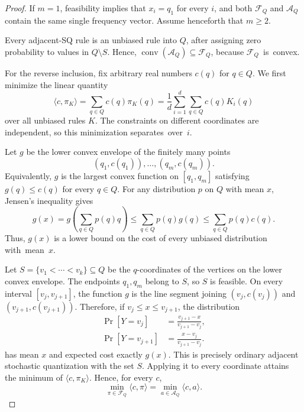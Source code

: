\documentclass[10pt,a4paper]{amsart}
\begin{document}
\begin{proof}
If $m=1$, feasibility implies that $x_i=q_1$ for every $i$, and both
$\mathcal{F}_Q$ and $\mathcal{A}_Q$ contain the same single frequency vector.
Assume henceforth that $m\ge2$.

Every adjacent-SQ rule is an unbiased rule into $Q$, after assigning zero
probability to values in $Q\setminus S$. Hence,
$\operatorname{conv}(\mathcal{A}_Q)\subseteq\mathcal{F}_Q$, because
\mbox{$\mathcal{F}_Q$ is convex.}

For the reverse inclusion, fix arbitrary real numbers $c(q)$ for $q\in Q$.
We first minimize the linear quantity
\[
\langle c,\pi_K\rangle
=\sum_{q\in Q}c(q)\pi_K(q)
=\frac{1}{d}\sum_{i=1}^d\sum_{q\in Q}c(q)K_i(q)
\]
over all unbiased rules $K$. The constraints on different coordinates are
independent, so this minimization \mbox{separates over $i$.}

Let $g$ be the lower convex envelope of the finitely many points
\[
(q_1,c(q_1)),\ldots,(q_m,c(q_m)).
\]
Equivalently, $g$ is the largest convex function on $[q_1,q_m]$ satisfying
$g(q)\le c(q)$ for every $q\in Q$. For any distribution $p$ on $Q$ with mean
$x$, Jensen's inequality gives
\[
g(x)
=g\!\left(\sum_{q\in Q}p(q)q\right)
\le\sum_{q\in Q}p(q)g(q)
\le\sum_{q\in Q}p(q)c(q).
\]
Thus, $g(x)$ is a lower bound on the cost of every unbiased distribution \mbox{with
mean $x$.}

Let $S=\{v_1<\cdots<v_k\}\subseteq Q$ be the $q$-coordinates of the vertices
on the lower convex envelope. The endpoints $q_1,q_m$ belong to $S$, so $S$ is
feasible. On every interval $[v_j,v_{j+1}]$, the function $g$ is the line
segment joining $(v_j,c(v_j))$ and $(v_{j+1},c(v_{j+1}))$. Therefore, if
$v_j\le x\le v_{j+1}$, the distribution
\begin{align*}
\Pr[Y=v_j]
&=\frac{v_{j+1}-x}{v_{j+1}-v_j},\\
\Pr[Y=v_{j+1}]
&=\frac{x-v_j}{v_{j+1}-v_j}.
\end{align*}
has mean $x$ and expected cost exactly $g(x)$. This is precisely ordinary
adjacent stochastic quantization with the set $S$. Applying it to every
coordinate attains the minimum of $\langle c,\pi_K\rangle$. Hence, for every
$c$,
\begin{equation}
\min_{\pi\in\mathcal{F}_Q}\langle c,\pi\rangle
=\min_{a\in\mathcal{A}_Q}\langle c,a\rangle.
\label{eq:timesharing-linear-minima}
\end{equation}


\end{proof}
\end{document}
